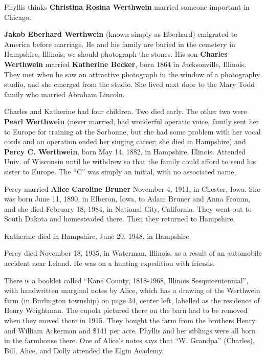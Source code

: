 Phyllis thinks {\bf Christina Rosina Werthwein} married someone important in Chicago.

{\bf Jakob Eberhard Werthwein} (known simply as Eberhard) emigrated to America before marriage.  He
and his family are buried in the cemetery in Hampshire, Illinois; we should photograph the stones.
His son {\bf Charles Werthwein} married {\bf Katherine Becker}, born 1864 in Jacksonville,
Illinois.  They met when he saw an attractive photograph in the window of a photography studio, and
she emerged from the studio.  She lived next door to the Mary Todd family who married Abraham
Lincoln.

Charles and Katherine had four children.  Two died early.  The other two were {\bf Pearl Werthwein}
(never married, had wonderful operatic voice, family sent her to Europe for training at the Sorbonne, but
she had some problem with her vocal cords and an operation ended her singing career; 
she died in Hampshire) and {\bf Percy C.{}
Werthwein}, born May 14, 1882, in Hampshire, Illinois.  Attended Univ. of Wisconsin until he withdrew so that
the family could afford to send his sister to Europe.  The ``C'' was simply an initial, 
with no associated name.

Percy married {\bf Alice Caroline Bruner} November 4, 1911, in Chester, Iowa.  She was born June
11, 1890, in Elberon, Iowa, to Adam Bruner and Anna Fromm, and she died February 18, 1984, in
National City, California.  They went out to South Dakota and homesteaded there.  Then they
returned to Hampshire.

Katherine died in Hampshire, June 20, 1948, in Hampshire.

Percy died November 18, 1935, in Waterman, Illinois, as a result of an automobile accident near
Leland.  He was on a hunting expedition with friends.

There is a booklet called ``Kane County, 1818-1968, Illinois Sesquicentennial'', with handwritten
marginal notes by Alice, which has a drawing of the Werthwein farm (in Burlington township) on page
34, center left, labelled as the residence of Henry Weightman.  The cupola pictured there on the
barn had to be removed when they moved there in 1915.  They bought the farm from the brothers Henry
and William Ackerman and \$141 per acre.  Phyllis and her siblings were all born in the farmhouse
there.  One of Alice's notes says that ``W. Grandpa'' (Charles), Bill, Alice, and Dolly attended
the Elgin Academy.

